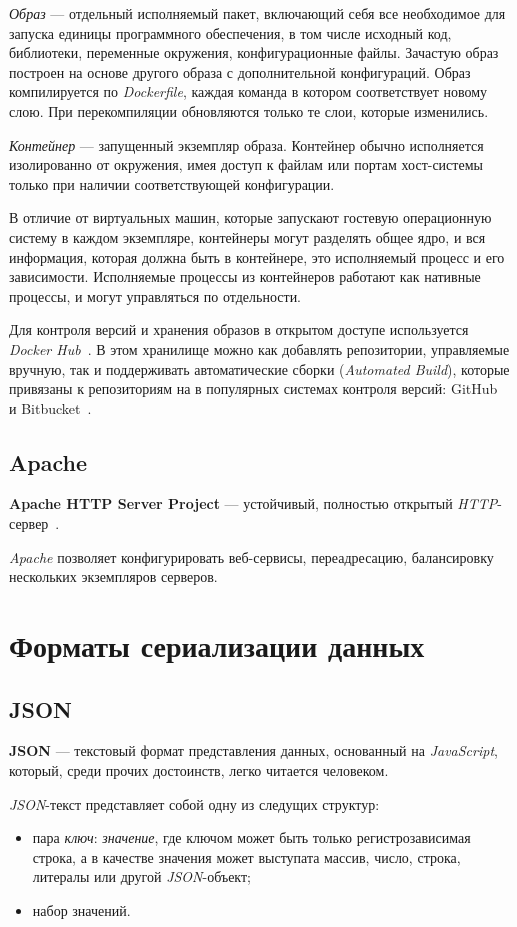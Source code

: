 \textit{Образ} --- отдельный исполняемый пакет, включающий себя все необходимое для запуска единицы программного обеспечения, в том числе исходный код, библиотеки, переменные окружения, конфигурационные файлы. Зачастую образ построен на основе другого образа с дополнительной конфигураций. Образ компилируется по \textit{Dockerfile}, каждая команда в котором соответствует новому слою. При перекомпиляции обновляются только те слои, которые изменились. 

\textit{Контейнер} --- запущенный экземпляр образа. Контейнер обычно исполняется изолированно от окружения, имея доступ к файлам или портам хост-системы только при наличии соответствующей конфигурации.

В отличие от виртуальных машин, которые запускают гостевую операционную систему в каждом экземпляре, контейнеры могут разделять общее ядро, и вся информация, которая должна быть в контейнере, это исполняемый процесс и его зависимости. Исполняемые процессы из контейнеров работают как нативные процессы, и могут управляться по отдельности. 

Для контроля версий и хранения образов в открытом доступе используется \emph{Docker Hub}~\cite{dhub}. В этом хранилище можно как добавлять репозитории, управляемые вручную, так и поддерживать автоматические сборки (\textit{Automated Build}), которые привязаны к репозиториям на в популярных системах контроля версий: GitHub~\cite{github} и Bitbucket~\cite{bitbucket}.
\subsection{Apache}
\textbf{Apache HTTP Server Project} --- устойчивый, полностью открытый \emph{HTTP}-сервер~\cite{apache}.

\emph{Apache} позволяет конфигурировать веб-сервисы, переадресацию, балансировку нескольких экземпляров серверов. 
\section{Форматы сериализации данных}
\subsection{JSON}
\textbf{JSON} --- текстовый формат представления данных, основанный на \emph{JavaScript}, который, среди прочих достоинств, легко читается человеком.

\emph{JSON}-текст представляет собой одну из следущих структур:\begin{itemize}
\item пара \textit{ключ}: \textit{значение}, где ключом может быть только регистрозависимая строка, а в качестве значения может выступата массив, число, строка, литералы или другой \emph{JSON}-объект;
\item набор значений.
\end{itemize}

